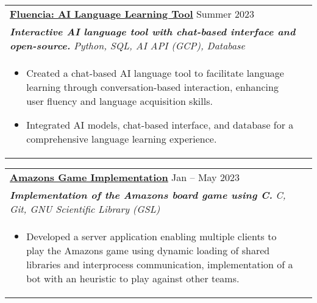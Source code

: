 \documentclass[a4paper,8pt]{article}
\begin{document}
\begin{tabularx}{\linewidth}{ @{}l r@{} }
\color[HTML]{1C033C} \textbf{\uline{\href{https://www.ibechoual-portfolio.codes/work/fluencia}{Fluencia: AI Language Learning Tool}}} \hfill \color[HTML]{371e77} Summer 2023 \\[4pt]
\color[HTML]{371e77}\textbf{\textit{Interactive AI language tool with chat-based interface and open-source.}} \hfill \color[HTML]{4B28A4} \textit{Python, SQL, AI API (GCP), Database} \\[5pt]
\begin{minipage}[t]{\linewidth}
    \begin{itemize}[nosep,after=\strut, leftmargin=2em, itemsep=2pt]
        \item Created a chat-based AI language tool to facilitate language learning through conversation-based interaction, enhancing user fluency and language acquisition skills.
        \item Integrated AI models, chat-based interface, and database for a comprehensive language learning experience.
    \end{itemize}
\end{minipage}
\end{tabularx}

\begin{tabularx}{\linewidth}{ @{}l r@{} }
\color[HTML]{1C033C} \textbf{\uline{\href{https://www.ibechoual-portfolio.codes/work/nested/amazon_game}{Amazons Game Implementation}}} \hfill \color[HTML]{371e77} Jan – May 2023 \\[4pt]
\color[HTML]{371e77}\textbf{\textit{Implementation of the Amazons board game using C.}} \hfill \color[HTML]{4B28A4} \textit{C, Git, GNU Scientific Library (GSL)} \\[5pt]
\begin{minipage}[t]{\linewidth}
    \begin{itemize}[nosep,after=\strut, leftmargin=2em, itemsep=2pt]
        \item Developed a server application enabling multiple clients to play the Amazons game using dynamic loading of shared libraries and interprocess communication, implementation of a bot with an heuristic to play against other teams.
    \end{itemize}
\end{minipage}
\end{tabularx}
\end{document}
